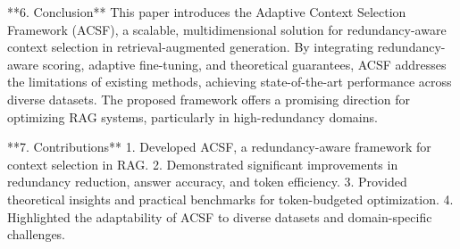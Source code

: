 **6. Conclusion**  
This paper introduces the Adaptive Context Selection Framework (ACSF), a scalable, multidimensional solution for redundancy-aware context selection in retrieval-augmented generation. By integrating redundancy-aware scoring, adaptive fine-tuning, and theoretical guarantees, ACSF addresses the limitations of existing methods, achieving state-of-the-art performance across diverse datasets. The proposed framework offers a promising direction for optimizing RAG systems, particularly in high-redundancy domains.  

**7. Contributions**  
1. Developed ACSF, a redundancy-aware framework for context selection in RAG.  
2. Demonstrated significant improvements in redundancy reduction, answer accuracy, and token efficiency.  
3. Provided theoretical insights and practical benchmarks for token-budgeted optimization.  
4. Highlighted the adaptability of ACSF to diverse datasets and domain-specific challenges.  